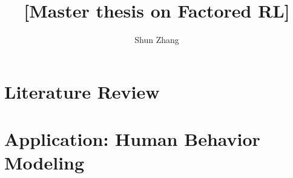 \documentclass[10pt]{book}
\title{[Master thesis on Factored RL]}
\author{Shun Zhang}
\date{}
\begin{document}
\maketitle

\chapter{Literature Review}


\chapter{Application: Human Behavior Modeling}




\end{document}
